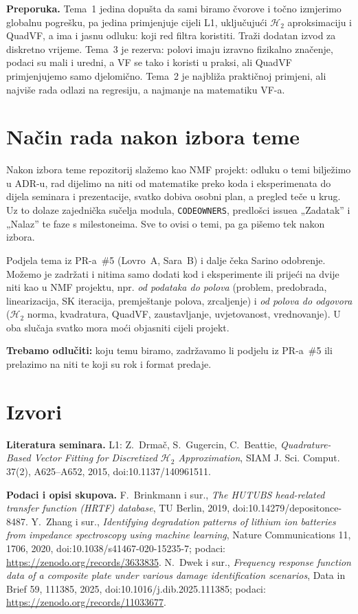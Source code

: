 \documentclass[10pt,a4paper]{article}
\newcommand{\Htwo}{\mathcal{H}_2}
\begin{document}
\textbf{Preporuka.} Tema~1 jedina dopušta da sami biramo čvorove i točno izmjerimo globalnu
pogrešku, pa jedina primjenjuje cijeli L1, uključujući $\Htwo$ aproksimaciju i QuadVF, a ima i
jasnu odluku: koji red filtra koristiti. Traži dodatan izvod za diskretno vrijeme. Tema~3 je
rezerva: polovi imaju izravno fizikalno značenje, podaci su mali i uredni, a VF se tako i koristi u
praksi, ali QuadVF primjenjujemo samo djelomično. Tema~2 je najbliža praktičnoj primjeni, ali najviše rada
odlazi na regresiju, a najmanje na matematiku VF-a.

\section{Način rada nakon izbora teme}

Nakon izbora teme repozitorij slažemo kao NMF projekt: odluku o temi bilježimo u ADR-u, rad dijelimo
na niti od matematike preko koda i eksperimenata do dijela seminara i prezentacije, svatko dobiva
osobni plan, a pregled teče u krug. Uz to dolaze zajednička sučelja modula, \texttt{CODEOWNERS},
predlošci issuea „Zadatak” i „Nalaz” te faze s milestoneima. Sve to ovisi o temi, pa ga pišemo
tek nakon izbora.

Podjela tema iz PR-a~\#5 (Lovro~A, Sara~B) i dalje čeka Sarino odobrenje. Možemo je zadržati i
nitima samo dodati kod i eksperimente ili prijeći na dvije niti kao u NMF projektu, npr.
\emph{od podataka do polova} (problem, predobrada, linearizacija, SK iteracija, premještanje polova,
zrcaljenje) i \emph{od polova do odgovora} ($\Htwo$ norma, kvadratura, QuadVF, zaustavljanje,
uvjetovanost, vrednovanje). U oba slučaja svatko mora moći objasniti cijeli projekt.

\textbf{Trebamo odlučiti:} koju temu biramo, zadržavamo li podjelu iz PR-a~\#5 ili prelazimo na niti
te koji su rok i format predaje.

\section*{Izvori}
{\footnotesize\raggedright
\textbf{Literatura seminara.}
L1: Z.~Drmač, S.~Gugercin, C.~Beattie, \emph{Quadrature-Based Vector Fitting for Discretized
$\mathcal{H}_2$ Approximation}, SIAM J. Sci. Comput. 37(2), A625--A652, 2015, doi:10.1137/140961511.

\textbf{Podaci i opisi skupova.}
F.~Brinkmann i sur., \emph{The HUTUBS head-related transfer function (HRTF) database}, TU Berlin, 2019,
doi:10.14279/depositonce-8487.
Y.~Zhang i sur., \emph{Identifying degradation patterns of lithium ion batteries from impedance
spectroscopy using machine learning}, Nature Communications 11, 1706, 2020,
doi:10.1038/s41467-020-15235-7; podaci: \url{https://zenodo.org/records/3633835}.
N.~Dwek i sur., \emph{Frequency response function data of a composite plate under various damage
identification scenarios}, Data in Brief 59, 111385, 2025, doi:10.1016/j.dib.2025.111385;
podaci: \url{https://zenodo.org/records/11033677}.
\par}
\end{document}
